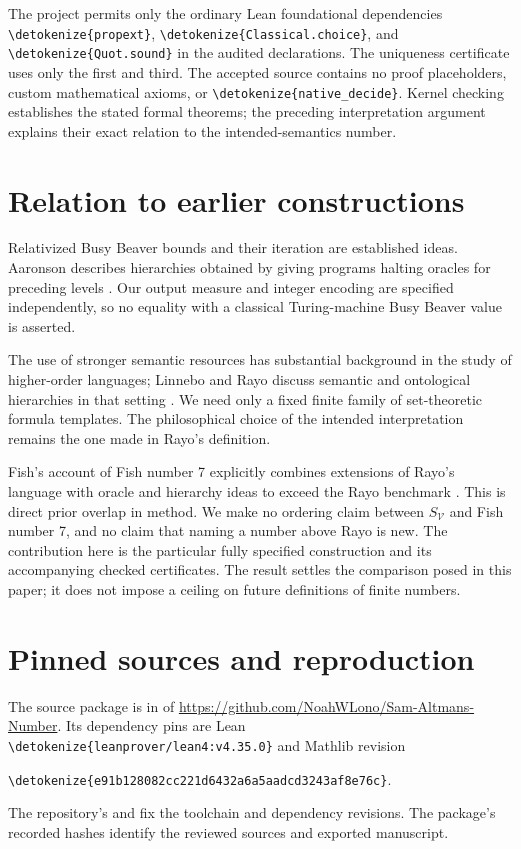 \documentclass[11pt]{article}
\newcommand{\V}{\mathcal V}
\newcommand{\code}[1]{{\small\expandafter\nolinkurl\expandafter{\detokenize{#1}}}}
\begin{document}
The project permits only the ordinary Lean foundational dependencies
\code{propext}, \code{Classical.choice}, and \code{Quot.sound} in the audited
declarations. The uniqueness certificate uses only the first and third.
The accepted source contains no proof placeholders, custom mathematical
axioms, or \code{native_decide}. Kernel checking establishes the stated
formal theorems; the preceding interpretation argument explains their exact
relation to the intended-semantics number.

\section{Relation to earlier constructions}

Relativized Busy Beaver bounds and their iteration are established ideas.
Aaronson describes hierarchies obtained by giving programs halting oracles
for preceding levels \cite{aaronson}. Our output measure and integer encoding
are specified independently, so no equality with a classical Turing-machine
Busy Beaver value is asserted.

The use of stronger semantic resources has substantial background in the
study of higher-order languages; Linnebo and Rayo discuss semantic and
ontological hierarchies in that setting \cite{linnebo-rayo}. We need only a
fixed finite family of set-theoretic formula templates. The philosophical
choice of the intended interpretation remains the one made in Rayo's
definition.

Fish's account of Fish number 7 explicitly combines extensions of Rayo's
language with oracle and hierarchy ideas to exceed the Rayo benchmark
\cite{fish}. This is direct prior overlap in method. We make no ordering
claim between $S_{\V}$ and Fish number 7, and no claim that naming a number
above Rayo is new. The contribution here is the particular fully specified
construction and its accompanying checked certificates. The result settles
the comparison posed in this paper; it does not impose a ceiling on future
definitions of finite numbers.

\appendix
\section{Pinned sources and reproduction}

The source package is in
 of
\url{https://github.com/NoahWLono/Sam-Altmans-Number}.
Its dependency pins are Lean \code{leanprover/lean4:v4.35.0} and Mathlib
revision
\begin{center}\code{e91b128082cc221d6432a6a5aadcd3243af8e76c}.\end{center}
The repository's  and  fix the
toolchain and dependency revisions. The package's recorded hashes identify
the reviewed sources and exported manuscript.
\end{document}
